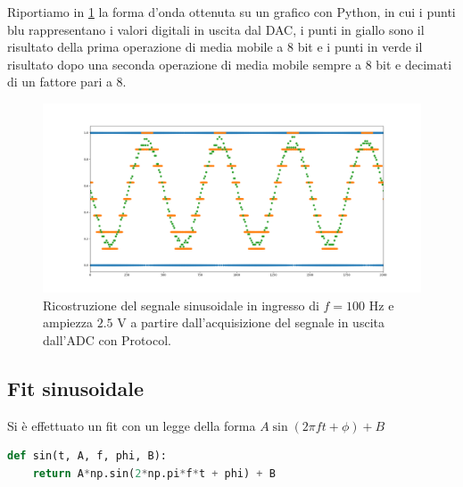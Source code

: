 \documentclass[10pt, a4paper, italian]{article}
\begin{document}
Riportiamo in \cref{fig: sin100hzpy} la forma d'onda ottenuta su un grafico
con Python, in cui i punti blu rappresentano i valori digitali in uscita dal
DAC, i punti in giallo sono il risultato della prima operazione di media
mobile a 8 bit e i punti in verde il risultato dopo una seconda operazione di media mobile sempre a 8 bit e decimati di un fattore pari a 8.
\begin{figure}[htbp]
    \centering
	\includegraphics[width=\textwidth]{sin100hzpy}
    \caption{Ricostruzione del segnale sinusoidale in ingresso di $f = 100$
    Hz e ampiezza $2.5$ V a partire dall'acquisizione del segnale in uscita
    dall'ADC con Protocol.
    \label{fig: sin100hzpy}}
\end{figure}



\subsection{Fit sinusoidale}
Si è effettuato un fit con un legge della forma $A\sin(2\pi f t + \phi) + B$
\begin{lstlisting}[language=Python]
def sin(t, A, f, phi, B):
    return A*np.sin(2*np.pi*f*t + phi) + B
\end{lstlisting}
\end{document}
